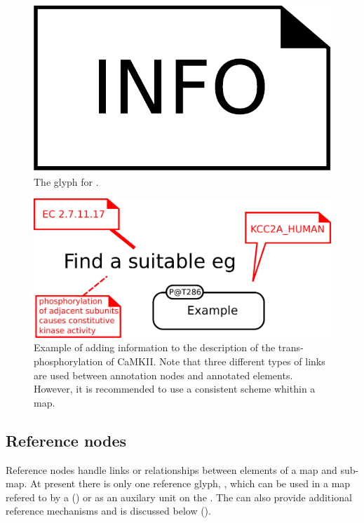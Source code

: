 \begin{figure}[H]
  \centering
  \includegraphics[scale = 0.3]{images/annotation}
  \caption{The \PD glyph for .}
  \label{fig:annotation}
\end{figure}

\begin{figure}[H]
  \centering
  \includegraphics[scale = 0.5]{examples/ex-annotation}
  \caption{Example of  adding information to the description of the trans-phosphorylation of CaMKII. Note that three different types of links are used between annotation nodes and annotated elements. However, it is recommended to use a consistent scheme whithin a map.}
  \label{fig:ex-annotation}
\end{figure}

\subsection{Reference nodes}

Reference nodes handle links or relationships between elements of a
map and sub-map. At present there is only one reference glyph,
, which can be used in a map refered to by a 
() or as an auxilary unit on the . The
 can also provide additional reference mechanisms
and is discussed below ().


